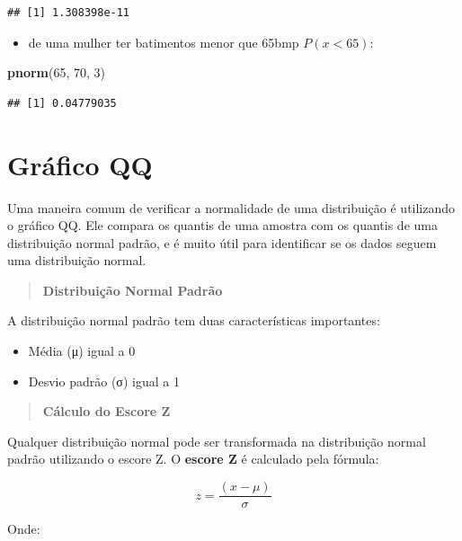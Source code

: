 \documentclass[
]{book}
\newenvironment{Shaded}{\begin{snugshade}}{\end{snugshade}}
\newcommand{\DecValTok}[1]{\textcolor[rgb]{0.00,0.00,0.81}{#1}}
\newcommand{\FunctionTok}[1]{\textcolor[rgb]{0.13,0.29,0.53}{\textbf{#1}}}
\newcommand{\NormalTok}[1]{#1}
\providecommand{\tightlist}{%
  \setlength{\itemsep}{0pt}\setlength{\parskip}{0pt}}
\begin{document}
\begin{verbatim}
## [1] 1.308398e-11
\end{verbatim}

\begin{itemize}
\tightlist
\item
  de uma mulher ter batimentos menor que 65bmp \(P(x < 65)\):
\end{itemize}

\begin{Shaded}
\begin{Highlighting}[]
\FunctionTok{pnorm}\NormalTok{(}\DecValTok{65}\NormalTok{, }\DecValTok{70}\NormalTok{, }\DecValTok{3}\NormalTok{)}
\end{Highlighting}
\end{Shaded}

\begin{verbatim}
## [1] 0.04779035
\end{verbatim}

\section{Gráfico QQ}\label{gruxe1fico-qq}

Uma maneira comum de verificar a normalidade de uma distribuição é utilizando o gráfico QQ. Ele compara os quantis de uma amostra com os quantis de uma distribuição normal padrão, e é muito útil para identificar se os dados seguem uma distribuição normal.

\begin{quote}
\textbf{Distribuição Normal Padrão}
\end{quote}

A distribuição normal padrão tem duas características importantes:

\begin{itemize}
\tightlist
\item
  Média (μ) igual a 0
\item
  Desvio padrão (σ) igual a 1
\end{itemize}

\begin{quote}
\textbf{Cálculo do Escore Z}
\end{quote}

Qualquer distribuição normal pode ser transformada na distribuição normal padrão utilizando o escore Z. O \textbf{escore Z} é calculado pela fórmula:

\[
z = \frac{(x - \mu)}{\sigma}
\]

Onde:
\end{document}
